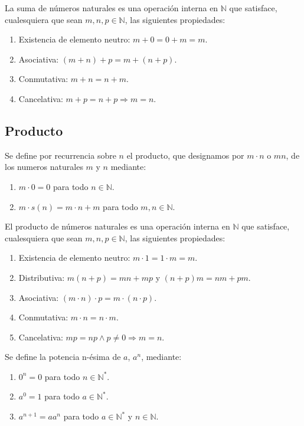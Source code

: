 La suma de números naturales es una operación interna en $\mathbb{N}$ que
satisface, cualesquiera que sean $m,n,p \in \mathbb{N}$, las siguientes
propiedades:

\begin{enumerate}
  \item Existencia de elemento neutro: $m+0=0+m=m$.
  \item Asociativa: $(m+n)+p=m+(n+p)$.
  \item Conmutativa: $m+n=n+m$.
  \item Cancelativa: $m+p=n+p \Rightarrow m=n$.
\end{enumerate}

\subsection{Producto}

Se define por recurrencia sobre $n$ el producto, que designamos por $m \cdot n$ o $mn$, de los numeros naturales $m$ y $n$ mediante:
\begin{enumerate}
	\item $m \cdot 0 = 0$ para todo $n \in \mathbb{N}$.
	\item $m \cdot s(n) = m \cdot n + m$ para todo $m, n \in \mathbb{N}$. 
\end{enumerate}

El producto de números naturales es una operación interna en $\mathbb{N}$ que satisface, cualesquiera que sean $m,n,p \in \mathbb{N}$, las siguientes propiedades:
\begin{enumerate}
	\item Existencia de elemento neutro: $m \cdot 1 = 1 \cdot m = m$.
	\item Distributiva: $m(n + p) = mn + mp$ y $(n+p)m = nm + pm$.
	\item Asociativa: $(m \cdot n) \cdot p = m \cdot (n \cdot p)$.
	\item Conmutativa: $m \cdot n = n \cdot m$.
	\item Cancelativa: $mp=np \wedge p \neq 0  \Rightarrow m=n$.
\end{enumerate}

Se define la potencia n-ésima de $a$, $a^n$, mediante:
\begin{enumerate}
	\item $0^n = 0$ para todo $n \in \mathbb{N}^*$.
	\item $a^0 = 1$ para todo $a \in \mathbb{N}^*$.
	\item $a^{n+1}=aa^n$ para todo $a \in \mathbb{N}^*$ y $n \in \mathbb{N}$.
\end{enumerate}

